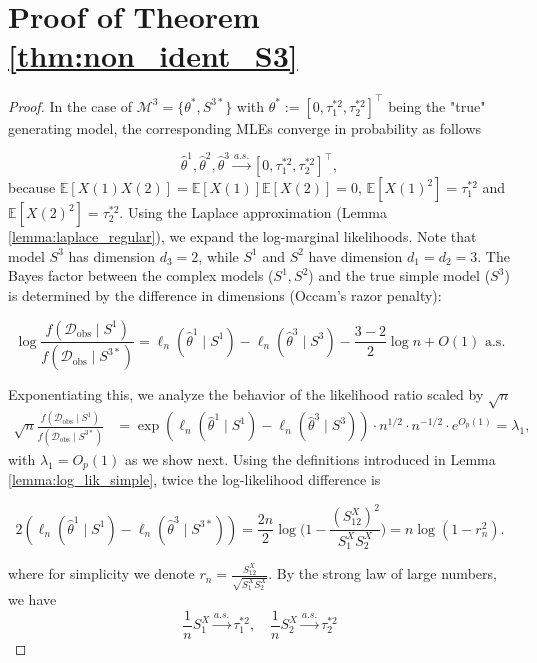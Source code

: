 \documentclass[accepted]{uai2026} %
\newcommand{\train}{\mathcal{D}}
\newcommand{\obsdata}{\train_{\text{obs}}}
\newcommand{\tsone}{\tau_1^{*2}}
\newcommand{\tstwo}{\tau_2^{*2}}
\def\transpose{\intercal}
\theoremstyle{boldremark}
\begin{document}
\section{Proof of Theorem \ref{thm:non_ident_S3}}
\label{appendix:proof_thm2_nonindent}
\begin{proof}
    In the case of $\mathcal{M}^3 = \{\theta^*, S^{3*}\}$ with $\theta^* := [0, \tsone, \tstwo]^\transpose$ being the "true" generating model, the corresponding MLEs converge in probability as follows

    $$\hat{\theta}^1, \hat{\theta}^2, \hat{\theta}^3  \xrightarrow{a.s.}[0, \tsone, \tstwo]^\transpose,$$
    because $\mathbb{E}[X(1)X(2)] = \mathbb{E}[X(1)]\mathbb{E}[X(2)] = 0$, $\mathbb{E}[X(1)^2] = \tsone$ and $\mathbb{E}[X(2)^2] = \tstwo$.
    Using the Laplace approximation (Lemma \ref{lemma:laplace_regular}), we expand the log-marginal likelihoods. Note that model $S^3$ has dimension $d_3=2$, while $S^1$ and $S^2$ have dimension $d_1=d_2=3$. The Bayes factor between the complex models ($S^1, S^2$) and the true simple model ($S^3$) is determined by the difference in dimensions (Occam's razor penalty):

    \begin{equation}
        \log \frac{f(\obsdata\mid S^1)}{f(\obsdata\mid S^{3*})} = \ell_n(\hat{\theta}^1\mid  S^1) - \ell_n(\hat{\theta}^3\mid S^3) - \frac{3-2}{2}\log n + O(1) \text{ a.s}.
    \end{equation}

    Exponentiating this, we analyze the behavior of the likelihood ratio scaled by $\sqrt{n}$
    \begin{align*}
        \sqrt{n} \frac{f(\obsdata\mid S^1)}{f(\obsdata\mid S^{3*})} &= \exp\left(\ell_n(\hat{\theta}^1\mid S^1) - \ell_n(\hat{\theta}^3\mid S^3) \right) \cdot n^{1/2} \cdot n^{-1/2} \cdot e^{O_p(1)} = \lambda_1,    
    \end{align*}
    with $\lambda_1 = O_p(1)$ as we show next. Using the definitions introduced in Lemma \ref{lemma:log_lik_simple}, twice the log-likelihood difference is 

    $$2(\ell_n(\hat{\theta}^1\mid S^1) - \ell_n(\hat{\theta}^3\mid S^{3*})) =\frac{2n}{2}\log\Big(1-\frac{(S_{12}^{X})^2}{S_1^XS_2^X}\Big) = n\log(1-r_n^2).$$
    
    where for simplicity we denote $r_n = \frac{S_{12}^X}{\sqrt{S_1^XS_2^X}}$. By the strong law of large numbers, we have
    \begin{equation}
    \label{eq:derivation_chi1}
            \frac{1}{n}S_1^X \xrightarrow{a.s.}\tsone, \quad \frac{1}{n}S_2^X \xrightarrow{a.s.}\tstwo
    \end{equation}


\end{proof}
\end{document}
